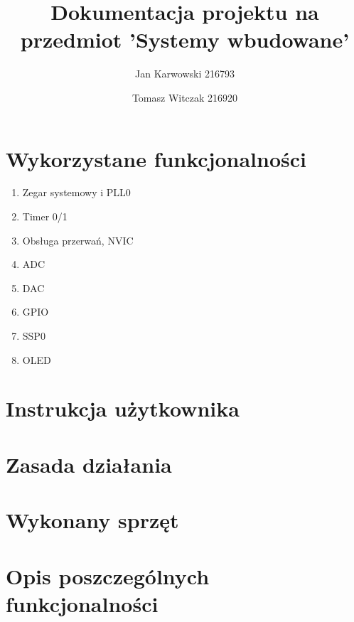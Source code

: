 \documentclass{article}
\author{
    Jan Karwowski 216793
        \and
    Tomasz Witczak 216920
}
\title{Dokumentacja projektu na przedmiot 'Systemy wbudowane'}
\begin{document}
\maketitle
\newpage

\section{Wykorzystane funkcjonalności}
\begin{enumerate}
    \item Zegar systemowy i PLL0
    \item Timer 0/1
    \item Obsługa przerwań, NVIC
    \item ADC
    \item DAC
    \item GPIO
    \item SSP0
    \item OLED
\end{enumerate}

\section{Instrukcja użytkownika}
\label{instrukcja_uzytkownika}


\section{Zasada działania}
\label{zasada_dzialania}


\section{Wykonany sprzęt}
\label{wykonany_sprzet}


\section{Opis poszczególnych funkcjonalności}








\end{document}
